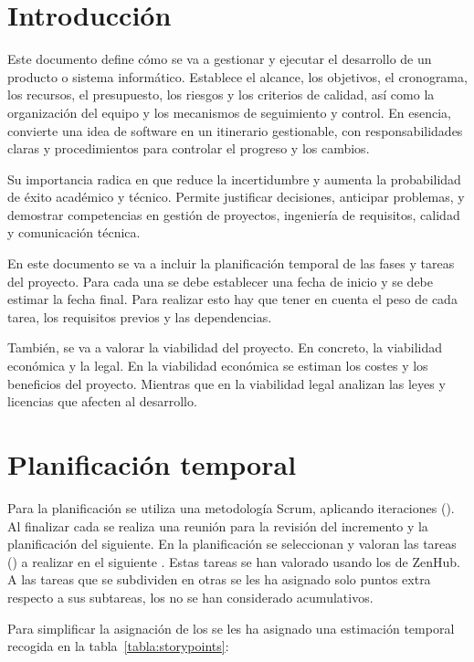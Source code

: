 
\section{Introducción}
Este documento define cómo se va a gestionar y ejecutar el desarrollo de un producto o sistema informático. Establece el alcance, los objetivos, el cronograma, los recursos, el presupuesto, los riesgos y los criterios de calidad, así como la organización del equipo y los mecanismos de seguimiento y control. En esencia, convierte una idea de software en un itinerario gestionable, con responsabilidades claras y procedimientos para controlar el progreso y los cambios.

Su importancia radica en que reduce la incertidumbre y aumenta la probabilidad de éxito académico y técnico. Permite justificar decisiones, anticipar problemas, y demostrar competencias en gestión de proyectos, ingeniería de requisitos, calidad y comunicación técnica.

En este documento se va a incluir la planificación temporal de las fases y tareas del proyecto. Para cada una se debe establecer una fecha de inicio y se debe estimar la fecha final. Para realizar esto hay que tener en cuenta el peso de cada tarea, los requisitos previos y las dependencias.

También, se va a valorar la viabilidad del proyecto. En concreto, la viabilidad económica y la legal. En la viabilidad económica se estiman los costes y los beneficios del proyecto. Mientras que en la viabilidad legal analizan las leyes y licencias que afecten al desarrollo.  

\section{Planificación temporal}
Para la planificación se utiliza una metodología Scrum, aplicando iteraciones (). Al finalizar cada  se realiza una reunión para la revisión del incremento y la planificación del siguiente. En la planificación se seleccionan y valoran las tareas () a realizar en el siguiente . Estas tareas se han valorado usando los  de ZenHub. A las tareas que se subdividen en otras se les ha asignado solo puntos extra respecto a sus subtareas, los  no se han considerado acumulativos.

Para simplificar la asignación de los  se les ha asignado una estimación temporal recogida en la tabla~\ref{tabla:storypoints}:

